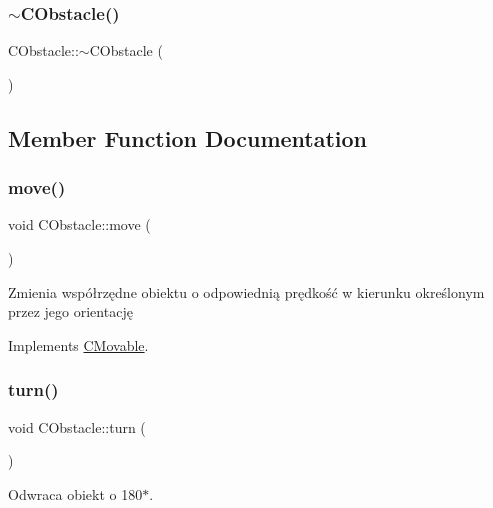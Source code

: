 \subsubsection{\texorpdfstring{$\sim$\+C\+Obstacle()}{~CObstacle()}}
{\footnotesize\ttfamily C\+Obstacle\+::$\sim$\+C\+Obstacle (\begin{DoxyParamCaption}{ }\end{DoxyParamCaption})\hspace{0.3cm}{\ttfamily [virtual]}}



\subsection{Member Function Documentation}
\mbox{\label{class_c_obstacle_a4b2e4989c993dd7f79cd66fd485c3c88}} 
\subsubsection{\texorpdfstring{move()}{move()}}
{\footnotesize\ttfamily void C\+Obstacle\+::move (\begin{DoxyParamCaption}{ }\end{DoxyParamCaption})\hspace{0.3cm}{\ttfamily [virtual]}}



Zmienia współrzędne obiektu o odpowiednią prędkość w kierunku określonym przez jego orientację 



Implements \mbox{\hyperlink{class_c_movable_a8e66e106f13362d24462ce0c9d0431af}{C\+Movable}}.

\mbox{\label{class_c_obstacle_ae3aded0a2ac060a2124250a42ddacee4}} 
\subsubsection{\texorpdfstring{turn()}{turn()}}
{\footnotesize\ttfamily void C\+Obstacle\+::turn (\begin{DoxyParamCaption}{ }\end{DoxyParamCaption})}



Odwraca obiekt o 180$\ast$. 

